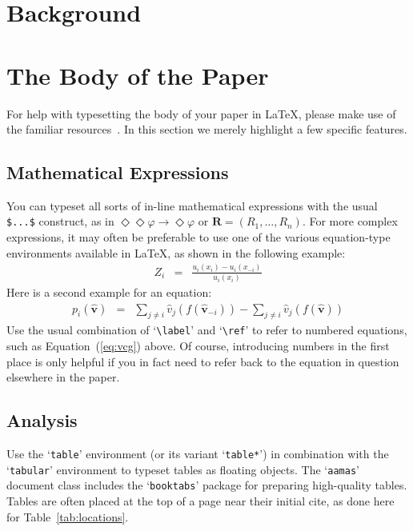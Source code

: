 \documentclass[sigconf]{aamas}
\begin{document}

\section{Background}



\section{The Body of the Paper}

For help with typesetting the body of your paper in \LaTeX\@, please 
make use of the familiar resources~\cite{Lam94}. In this section we 
merely highlight a few specific features. 

\subsection{Mathematical Expressions}

You can typeset all sorts of in-line mathematical expressions 
with the usual \verb|$...$| construct, as in 
$\Diamond\Diamond\varphi \rightarrow \Diamond\varphi$ or 
$\boldsymbol{R} = (R_1,\ldots,R_n)$.
For more complex expressions, it may often be preferable to use one of
the various equation-type environments available in \LaTeX\@, as shown 
in the following example:
%
\begin{eqnarray}
Z_i & = & \frac{u_i(x_i) - u_i(x_{-i})}{u_i(x_i)}
\end{eqnarray}
%
Here is a second example for an equation: 
%
\begin{eqnarray}\label{eq:vcg}
p_i(\boldsymbol{\hat{v}}) & = &
\sum_{j \neq i} \hat{v}_j(f(\boldsymbol{\hat{v}}_{-i})) - 
\sum_{j \neq i} \hat{v}_j(f(\boldsymbol{\hat{v}})) 
\end{eqnarray}
%
Use the usual combination of `\verb|\label|' and `\verb|\ref|' to refer
to numbered equations, such as Equation~(\ref{eq:vcg}) above. Of course,
introducing numbers in the first place is only helpful if you in fact 
need to refer back to the equation in question elsewhere in the paper.


\subsection{Analysis}

Use the `\texttt{table}' environment (or its variant `\texttt{table*}')
in combination with the `\texttt{tabular}' environment to typeset tables
as floating objects. The `\texttt{aamas}' document class includes the 
`\texttt{booktabs}' package for preparing high-quality tables. Tables 
are often placed at the top of a page near their initial cite, as done 
here for Table~\ref{tab:locations}.
\end{document}
